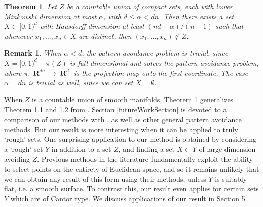 \documentclass[dvipsnames,letterpaper,12pt]{article}
\numberwithin{equation}{section}
\theoremstyle{plain}
\newtheorem{theorem}{Theorem}
\newtheorem*{remark}{Remark}
\DeclareMathOperator{\RR}{\mathbf{R}}
\begin{document}
\begin{theorem}\label{mainTheorem}
	Let $Z$ be a countable union of compact sets, each with lower Minkowski dimension at most $\alpha$, with $d \leq \alpha < dn$. Then there exists a set $X \subset [0,1)^d$ with Hausdorff dimension at least $(nd - \alpha)/(n-1)$ such that whenever $x_1, \dots, x_n \in X$ are distinct, then $(x_1, \dots, x_n) \not \in Z$.
\end{theorem}

\begin{remark}
	When $\alpha < d$, the pattern avoidance problem is trivial, since $X = [0,1)^d - \pi(Z)$ is full dimensional and solves the pattern avoidance problem, where $\pi \colon \RR^{dn} \to \RR^d$ is the projection map onto the first coordinate. The case $\alpha = dn$ is trivial as well, since we can set $X = \emptyset$.

\end{remark}


When $Z$ is a countable union of smooth manifolds, Theorem \ref{mainTheorem} generalizes Theorem 1.1 and 1.2 from \cite{MalabikaRob}. Section \ref{futureWorkSection} is devoted to a comparison of our methods with \cite{MalabikaRob}, as well as other general pattern avoidance methods. But our result is more interesting when it can be applied to truly `rough' sets. One surprising application to our method is obtained by considering a `rough' set $Y$ in addition to a set $Z$, and finding a set $X \subset Y$ of large dimension avoiding $Z$. Previous methods in the literature fundamentally exploit the ability to select points on the entirety of Euclidean space, and so it remains unlikely that we can obtain any result of this form using their methods, unless $Y$ is suitably flat, i.e. a smooth surface. To contrast this, our result even applies for certain sets $Y$ which are of Cantor type. We discuss applications of our result in Section 5.

\end{document}
